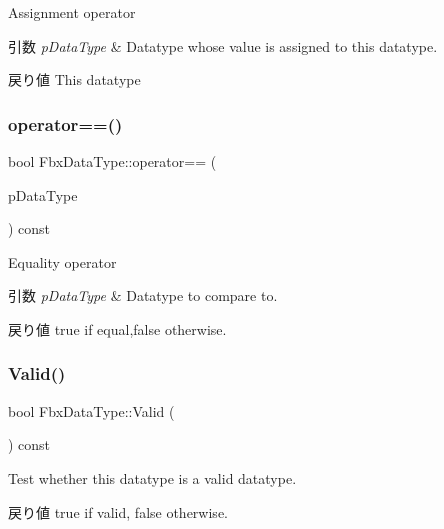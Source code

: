 Assignment operator 
\begin{DoxyParams}{引数}
{\em p\+Data\+Type} & Datatype whose value is assigned to this datatype. \\
\hline
\end{DoxyParams}
\begin{DoxyReturn}{戻り値}
This datatype 
\end{DoxyReturn}
\mbox{\label{class_fbx_data_type_adb742e131aeab52ff8ca3bc095026e3d}} 
\subsubsection{\texorpdfstring{operator==()}{operator==()}}
{\footnotesize\ttfamily bool Fbx\+Data\+Type\+::operator== (\begin{DoxyParamCaption}\item[{const \hyperlink{class_fbx_data_type}{Fbx\+Data\+Type} \&}]{p\+Data\+Type }\end{DoxyParamCaption}) const}

Equality operator 
\begin{DoxyParams}{引数}
{\em p\+Data\+Type} & Datatype to compare to. \\
\hline
\end{DoxyParams}
\begin{DoxyReturn}{戻り値}
{\ttfamily true} if equal,{\ttfamily false} otherwise. 
\end{DoxyReturn}
\mbox{\label{class_fbx_data_type_a3a03c1554f9a0f6f0536bbe696e4fa67}} 
\subsubsection{\texorpdfstring{Valid()}{Valid()}}
{\footnotesize\ttfamily bool Fbx\+Data\+Type\+::\+Valid (\begin{DoxyParamCaption}{ }\end{DoxyParamCaption}) const}

Test whether this datatype is a valid datatype. \begin{DoxyReturn}{戻り値}
{\ttfamily true} if valid, {\ttfamily false} otherwise. 
\end{DoxyReturn}


